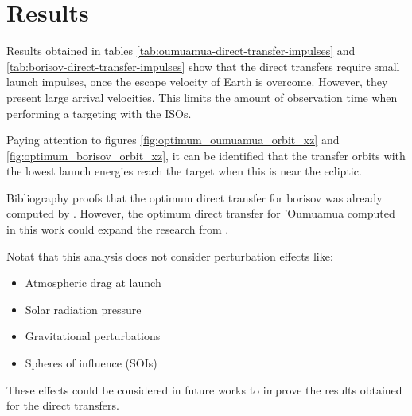 \section{Results}
\label{sec:direct-results}

Results obtained in tables \ref{tab:oumuamua-direct-transfer-impulses} and
\ref{tab:borisov-direct-transfer-impulses} show that the direct transfers
require small launch impulses, once the escape velocity of Earth is overcome.
However, they present large arrival velocities. This limits the amount of
observation time when performing a targeting with the ISOs.

Paying attention to figures \ref{fig:optimum_oumuamua_orbit_xz} and
\ref{fig:optimum_borisov_orbit_xz}, it can be identified that the transfer
orbits with the lowest launch energies reach the target when this is near the
ecliptic.

Bibliography proofs that the optimum direct transfer for borisov was already
computed by \cite{hibberd2021}. However, the optimum direct transfer for
'Oumuamua computed in this work could expand the research from \cite{hein2018}.

Notat that this analysis does not consider perturbation effects like:

\begin{itemize}
  \item Atmospheric drag at launch
  \item Solar radiation pressure
  \item Gravitational perturbations
  \item Spheres of influence (SOIs)
\end{itemize}

These effects could be considered in future works to improve the results
obtained for the direct transfers.

